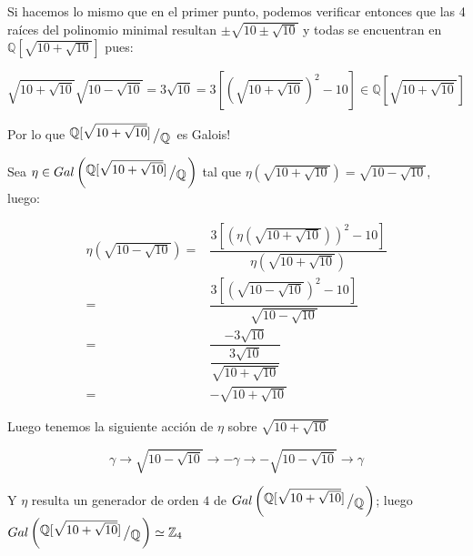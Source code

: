 \documentclass[11pt]{article}
\newcommand{\Q}{\mathbb{Q}}
\newcommand{\Z}{\mathbb{Z}}
\newcommand{\quotient}[2]{{\raisebox{.2em}{$#1$}\left/\raisebox{-.2em}{$#2$}\right.}}
\numberwithin{theorem}{subsection}
\begin{document}
\begin{enumerate}
\begin{itemize}
		Si hacemos lo mismo que en el primer punto, podemos verificar entonces que las 4 ra\'ices del polinomio minimal resultan $\pm \sqrt{10 \pm \sqrt{10}}$ y todas se encuentran en $\Q[\sqrt{10 + \sqrt{10}}]$ pues:
		
		\begin{equation*}
		\sqrt{10 + \sqrt{10}} \sqrt{10 - \sqrt{10}} = 3 \sqrt{10} = 3 \left[\left(\sqrt{10 + \sqrt{10}}\right)^2 -10 \right] \in \Q[\sqrt{10 + \sqrt{10}}]
		\end{equation*}
		
		Por lo que $\quotient{\Q[\sqrt{10 + \sqrt{10}}]}{\Q}$ es Galois!
		
		Sea $\eta \in Gal\left(\quotient{\Q[\sqrt{10 + \sqrt{10}}]}{\Q}\right)$ tal que $\eta(\sqrt{10 + \sqrt{10}}) = \sqrt{10 - \sqrt{10}}$, luego:
		
		\begin{equation*}
			\begin{aligned}
				\eta\left(\sqrt{10 - \sqrt{10}}\right) = & \dfrac{3 \left[\left(\eta(\sqrt{10 + \sqrt{10}})\right)^2 -10 \right] }{\eta(\sqrt{10+\sqrt{10}})} \\
				= &  \dfrac{3 \left[\left(\sqrt{10 - \sqrt{10}}\right)^2 -10 \right] }{\sqrt{10-\sqrt{10}}} \\
				= &  \dfrac{-3 \sqrt{10}}{\dfrac{3\sqrt{10}}{\sqrt{10 + \sqrt{10}}}} \\
				= & -\sqrt{10 + \sqrt{10}}
			\end{aligned}
		\end{equation*}
		
		Luego tenemos la siguiente acci\'on de $\eta$ sobre $\sqrt{10+\sqrt{10}}$
		
		\begin{equation*}
			\gamma \rightarrow \sqrt{10 - \sqrt{10}} \rightarrow - \gamma \rightarrow - \sqrt{10 - \sqrt{10}} \rightarrow \gamma
		\end{equation*}
		
		Y $\eta$ resulta un generador de orden $4$ de $Gal\left(\quotient{\Q[\sqrt{10 + \sqrt{10}}]}{\Q}\right)$; luego $Gal\left(\quotient{\Q[\sqrt{10 + \sqrt{10}}]}{\Q}\right) \simeq \Z_4$
		

\end{itemize}
\end{enumerate}
\end{document}
